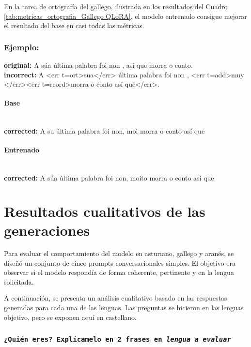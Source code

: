En la tarea de ortografía del gallego, ilustrada en los resultados del Cuadro \ref{tab:metricas_ortografia_Gallego QLoRA}, el modelo entrenado consigue mejorar el resultado del base en casi todas las métricas.

\subsubsection{Ejemplo:}
\textbf{original:} A súa última palabra foi non , así que morra o conto.\\
\textbf{incorrect:} A {\textless}err t=ort{\textgreater}sua{\textless}/err{\textgreater} última palabra foi non , {\textless}err t=add{\textgreater}muy {\textless}/err{\textgreater}{\textless}err t=reord{\textgreater}morra o conto así que{\textless}/err{\textgreater}.

\paragraph{Base}~\\
\textbf{corrected:} A su última palabra foi non, moi morra o conto así que

\paragraph{Entrenado}~\\
\textbf{corrected:} A súa última palabra foi non, moito morra o conto así que

\vspace{1em}

\section{Resultados cualitativos de las generaciones}
\label{resultados_cualitativos_qlora}
Para evaluar el comportamiento del modelo en asturiano, gallego y aranés, se diseñó un conjunto de cinco prompts conversacionales simples. El objetivo era observar si el modelo respondía de forma coherente, pertinente y en la lengua solicitada. 

A continuación, se presenta un análisis cualitativo basado en las respuestas generadas para cada una de las lenguas. Las preguntas se hicieron en las lenguas objetivo, pero se exponen aquí en castellano.


\subsubsection{\fontsize{15}{15}\texttt{¿Quién eres? Explícamelo en 2 frases en \textit{lengua a evaluar}}}


